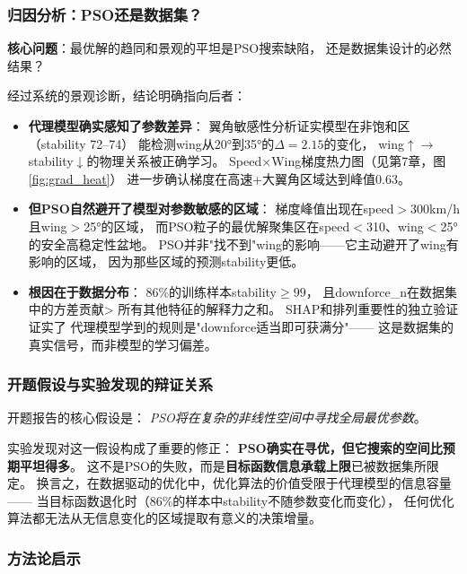 \subsubsection{归因分析：PSO还是数据集？}

\textbf{核心问题}：最优解的趋同和景观的平坦是PSO搜索缺陷，
还是数据集设计的必然结果？

经过系统的景观诊断，结论明确指向后者：

\begin{itemize}
    \item \textbf{代理模型确实感知了参数差异}：
        翼角敏感性分析证实模型在非饱和区（stability 72--74）
        能检测wing从20°到35°的$\Delta=2.15$的变化，
        wing$\uparrow$$\to$stability$\downarrow$的物理关系被正确学习。
        Speed$\times$Wing梯度热力图（见第7章，图\ref{fig:grad_heat}）
        进一步确认梯度在高速+大翼角区域达到峰值0.63。

    \item \textbf{但PSO自然避开了模型对参数敏感的区域}：
        梯度峰值出现在speed$>$300km/h且wing$>$25°的区域，
        而PSO粒子的最优解聚集区在speed$<$310、wing$<$25°的安全高稳定性盆地。
        PSO并非"找不到"wing的影响——它主动避开了wing有影响的区域，
        因为那些区域的预测stability更低。

    \item \textbf{根因在于数据分布}：
        86\%的训练样本stability$\geq 99$，
        且downforce\_n在数据集中的方差贡献>
        所有其他特征的解释力之和。
        SHAP和排列重要性的独立验证证实了
        代理模型学到的规则是"downforce适当即可获满分"——
        这是数据集的真实信号，而非模型的学习偏差。
\end{itemize}

\subsubsection{开题假设与实验发现的辩证关系}

开题报告的核心假设是：
\textit{PSO将在复杂的非线性空间中寻找全局最优参数}。

实验发现对这一假设构成了重要的修正：
\textbf{PSO确实在寻优，但它搜索的空间比预期平坦得多}。
这不是PSO的失败，而是\textbf{目标函数信息承载上限}已被数据集所限定。
换言之，在数据驱动的优化中，优化算法的价值受限于代理模型的信息容量——
当目标函数退化时（86\%的样本中stability不随参数变化而变化），
任何优化算法都无法从无信息变化的区域提取有意义的决策增量。

\subsubsection{方法论启示}

